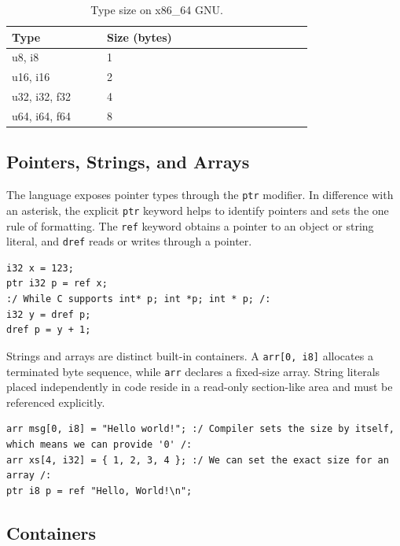 \documentclass[10pt,twocolumn]{article}
\begin{document}
\begin{table}[t]
    \centering
    \footnotesize
    \caption{Type size on x86\_64 GNU.}
    \label{tab:type_sizes}
    \begin{tabular}{p{0.24\linewidth}p{0.20\linewidth}p{0.32\linewidth}}
    \toprule
    Type          & Size (bytes) \\
    \midrule
    u8, i8        & 1             \\
    u16, i16      & 2             \\
    u32, i32, f32 & 4             \\
    u64, i64, f64 & 8             \\
    \bottomrule
    \end{tabular}
\end{table}

\subsection{Pointers, Strings, and Arrays}
\par The language exposes pointer types through the \texttt{ptr} modifier. In difference with an asterisk, the explicit \texttt{ptr} keyword helps to identify pointers and sets the one rule of formatting. The \texttt{ref} keyword obtains a pointer to an object or string literal, and \texttt{dref} reads or writes through a pointer.

\begin{lstlisting}[language=APL,caption={Pointer operations in APL.}]
i32 x = 123;
ptr i32 p = ref x;
:/ While C supports int* p; int *p; int * p; /:
i32 y = dref p;
dref p = y + 1;
\end{lstlisting}

\par Strings and arrays are distinct built-in containers. A \texttt{arr[0, i8]} allocates a terminated byte sequence, while \texttt{arr} declares a fixed-size array. String literals placed independently in code reside in a read-only section-like area and must be referenced explicitly.

\begin{lstlisting}[language=APL,caption={Strings and arrays.}]
arr msg[0, i8] = "Hello world!"; :/ Compiler sets the size by itself, which means we can provide '0' /:
arr xs[4, i32] = { 1, 2, 3, 4 }; :/ We can set the exact size for an array /:
ptr i8 p = ref "Hello, World!\n";
\end{lstlisting}

\subsection{Containers}
\end{document}
